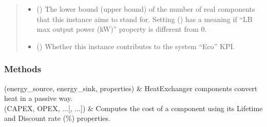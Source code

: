 \documentclass[letterpaper,10pt,english]{sphinxmanual}
\begin{document}
\begin{fulllineitems}
\begin{fulllineitems}
\begin{quote}
\begin{description}
\begin{itemize}
\item {} 
\sphinxAtStartPar
{} (\sphinxstyleliteralemphasis{\sphinxupquote{, }}\sphinxstyleliteralemphasis{\sphinxupquote{, }}) \textendash{} The lower bound (upper bound) of the number of real components that this instance aims to stand for.
Setting  () has a meaning if “LB max output power (kW)” property is
different from 0.

\item {} 
\sphinxAtStartPar
{} (\sphinxstyleliteralemphasis{\sphinxupquote{, }}\sphinxstyleliteralemphasis{\sphinxupquote{, }}) \textendash{} Whether this instance contributes to the system “Eco” KPI.

\end{itemize}

\end{description}\end{quote}

\end{fulllineitems}

\subsubsection*{Methods}


\begin{savenotes}\sphinxattablestart
\centering
\begin{tabulary}{\linewidth}[t]{}
\hline

\sphinxAtStartPar
{\hyperref[\detokenize{generated/tamos.production.HeatExchanger:tamos.production.HeatExchanger.__init__}]{}}(energy\_source, energy\_sink, properties)
&
\sphinxAtStartPar
HeatExchanger components convert heat in a passive way.
\\
\hline
\sphinxAtStartPar
{\hyperref[\detokenize{generated/tamos.production.HeatExchanger:tamos.production.HeatExchanger.compute_actualized_cost}]{}}(CAPEX, OPEX, ...{[}, ...{]})
&
\sphinxAtStartPar
Computes the cost of a component using its \textquotesingle{}Lifetime\textquotesingle{} and \textquotesingle{}Discount rate (\%)\textquotesingle{} properties.
\\
\hline
\end{tabulary}
\par
\sphinxattableend\end{savenotes}

\end{fulllineitems}
\end{document}
